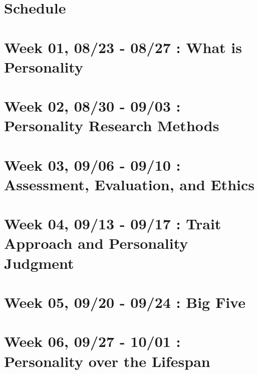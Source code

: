 \documentclass[
]{book}
\begin{document}
\hypertarget{schedule}{%
\section{Schedule}\label{schedule}}

\hypertarget{week-01-0823---0827-what-is-personality}{%
\section*{Week 01, 08/23 - 08/27 : What is Personality}\label{week-01-0823---0827-what-is-personality}}

\hypertarget{week-02-0830---0903-personality-research-methods}{%
\section*{Week 02, 08/30 - 09/03 : Personality Research Methods}\label{week-02-0830---0903-personality-research-methods}}

\hypertarget{week-03-0906---0910-assessment-evaluation-and-ethics}{%
\section*{Week 03, 09/06 - 09/10 : Assessment, Evaluation, and Ethics}\label{week-03-0906---0910-assessment-evaluation-and-ethics}}

\hypertarget{week-04-0913---0917-trait-approach-and-personality-judgment}{%
\section*{Week 04, 09/13 - 09/17 : Trait Approach and Personality Judgment}\label{week-04-0913---0917-trait-approach-and-personality-judgment}}

\hypertarget{week-05-0920---0924-big-five}{%
\section*{Week 05, 09/20 - 09/24 : Big Five}\label{week-05-0920---0924-big-five}}

\hypertarget{week-06-0927---1001-personality-over-the-lifespan}{%
\section*{Week 06, 09/27 - 10/01 : Personality over the Lifespan}\label{week-06-0927---1001-personality-over-the-lifespan}}
\end{document}
